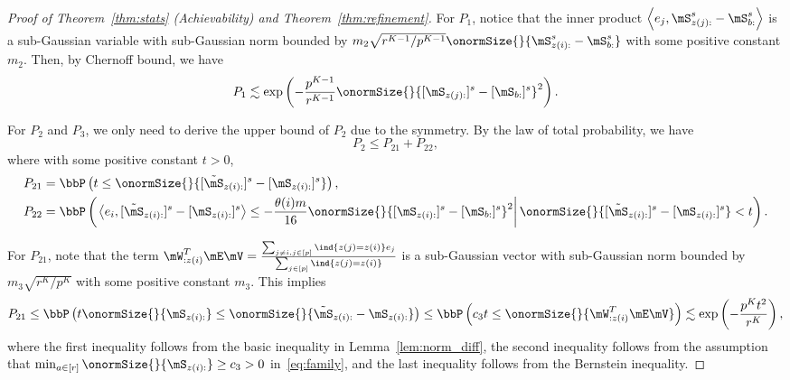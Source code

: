 \documentclass[lettersize,onecolumn,journal]{IEEEtran}
\theoremstyle{definition}
\theoremstyle{definition}
\newcommand{\of}[1]{\left(#1\right)}
\newcommand{\ang}[1]{\left\langle#1\right\rangle}
\begin{document}
\begin{proof}[Proof of Theorem~\ref{thm:stats} (Achievability) and Theorem~\ref{thm:refinement}]
    For $P_1$, notice that the inner product $\ang{e_j,\mS_{z(j):}^s - \mS_{b:}^s} $ is a sub-Gaussian variable with sub-Gaussian norm bounded by $m_2 \sqrt{ r^{K-1}/ p^{K-1} } \onormSize{}{ \mS_{z(i):}^s -  \mS_{b:}^s }$ with some positive constant $m_2$. Then, by Chernoff bound, we have  
    \begin{equation}\label{eq:p1_2}
         P_1 \lesssim \exp \of{  - \frac{p^{K-1}}{r^{K-1}}   \onormSize{}{ [ \mS_{z(j):}  ]^s - [ \mS_{b:}  ]^s  }^2 }.
    \end{equation}
    
    For $P_2$ and $P_3$, we only need to derive the upper bound of $P_2$ due to the symmetry. By the law of total probability, we have 
    \begin{equation}\label{eq:p2}
        P_2 \leq P_{21} + P_{22},
    \end{equation}
    where with some positive constant $t>0$,
    \begin{align}
        P_{21}& =  \bbP \of{ t \leq   \onormSize{}{ [ \tilde  \mS_{z(i):} ]^s - [ \mS_{z(i):} ]^s }},\\
        P_{22} &= \bbP \of{ \left. \ang{e_i, [ \tilde  \mS_{z(i):} ]^s - [ \mS_{z(i):} ]^s} \leq -\frac{\theta(i)m}{16}  \onormSize{}{ [ \mS_{z(i):}  ]^s - [ \mS_{b:}  ]^s  }^2 \right| \onormSize{}{ [ \tilde  \mS_{z(i):} ]^s - [ \mS_{z(i):} ]^s } < t  }.
    \end{align}
    
    For $P_{21}$, note that the term $\mW^T_{: z(i)} \mE \mV = \frac{ \sum_{ j \neq i, j \in [p]} \ind \{ z(j) = z(i) \} e_j }{\sum_{j \in [p]} \ind \{ z(j) = z(i) \} }$  is a sub-Gaussian vector with sub-Gaussian norm bounded by $m_3 \sqrt{r^K/ p^K}$ with some positive constant $m_3$. This implies
        \begin{align}
        P_{21} \leq \bbP\of{ t \onormSize{}{\mS_{z(i):} } \leq \onormSize{}{ \tilde  \mS_{z(i):}  -  \mS_{z(i):} }  } \leq \bbP\of{c_3 t \leq  \onormSize{}{ \mW^T_{: z(i)} \mE \mV  } } 
        \lesssim \exp\of{ - \frac{p^K t^2}{r^K} }, \label{eq:p21}
    \end{align}
    where the first inequality follows from the basic inequality in Lemma~\ref{lem:norm_diff}, the second inequality follows from the assumption that $ \min_{a \in [r]} \onormSize{}{\mS_{z(i):}} \geq c_3>0$ in~\eqref{eq:family}, and the last inequality follows from the Bernstein inequality.
    

\end{proof}
\end{document}

